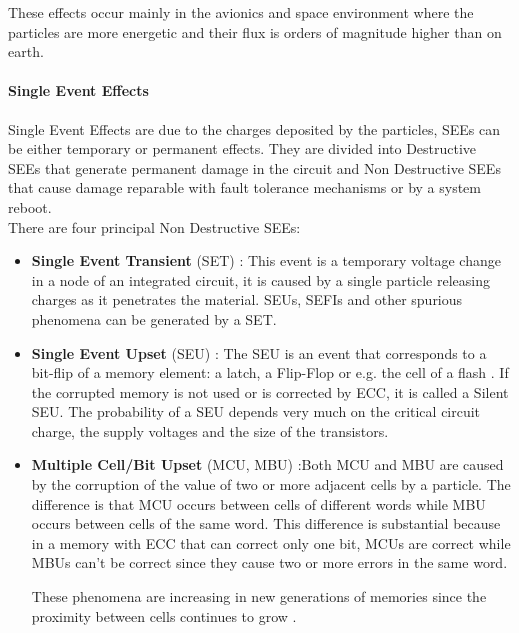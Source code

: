 {{{{{\begin{itemize}
					\end{itemize}
					
					These effects occur mainly in the avionics and space environment where the particles are more energetic and their flux is orders of magnitude higher than on earth.
					
				}%
				\paragraph{Single Event Effects}{
					Single Event Effects are due to the charges deposited by the particles, SEEs can be either temporary or permanent effects. They are divided into Destructive SEEs that generate permanent damage in the circuit and Non Destructive SEEs that cause damage reparable with fault tolerance mechanisms or by a system reboot.\\
					
					There are four principal Non Destructive SEEs:
					\begin{itemize}
						\item \textbf{Single Event Transient} (SET) : This event is a temporary voltage change in a node of an integrated circuit, it is caused by a single particle releasing charges as it penetrates the material. SEUs, SEFIs and other spurious phenomena can be generated by a SET.
						
						\item \textbf{Single Event Upset} (SEU) : The SEU is an event that corresponds to a bit-flip of a memory element: a latch, a Flip-Flop or e.g. the cell of a flash . If the corrupted memory is not used or is corrected  by ECC, it is called a Silent SEU. The probability of a SEU depends very much on the critical circuit charge, the supply voltages and the size of the transistors.
						
						\item \textbf{Multiple Cell/Bit Upset} (MCU, MBU) :Both MCU and MBU are caused by the corruption of the value of two or more adjacent cells by a particle. The difference is that MCU occurs between cells of different words while MBU occurs between cells of the same word. This difference is substantial because in a memory with ECC that can correct only one bit, MCUs are correct while MBUs can't be correct since they cause two or more errors in the same word.
						
						These phenomena are increasing in new generations of memories since the proximity between cells continues to grow .
						

\end{itemize}}}}}}
